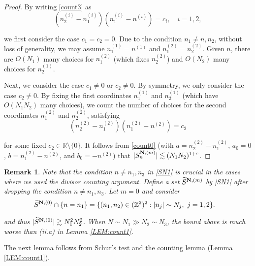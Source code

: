 \documentclass[%
11pt,  reqno]{amsart}
\newtheorem{remark}[theorem]{Remark}
\newcommand{\1}{\hspace{0.2mm}\text{I}\hspace{0.2mm}}
\newcommand{\noi}{\noindent}
\newcommand{\Z}{\mathbb{Z}}
\newcommand{\R}{\mathbb{R}}
\newcommand{\eps}{\varepsilon}
\newcommand{\wt}{\widetilde}
\newcommand{\les}{\lesssim}
\newcommand{\ges}{\gtrsim}
\numberwithin{equation}{section}
\numberwithin{theorem}{section}
\begin{document}
\begin{proof}
\noi
By writing \eqref{count3}
as 
\[
(n_2^{(i)}- n_1^{(i)}) (n_1^{(i)} - n^{(i)}) = c_i, \quad i = 1, 2, 
\]


\noi
we first consider the case $c_1 = c_2 = 0$.
Due to the condition $n_1 \neq n, n_2$, without loss of generality, we may assume 
$n_1^{(1)} = n^{(1)}$ and $n_1^{(2)} = n_2^{(2)}$. 
Given $n$, 
there are $O(N_1)$ many choices for $n_1^{(2)}$
(which fixes $n_2^{(2)}$)
and $O(N_2)$ many choices for $n_2^{(1)}$.



Next, we consider the case  $c_1 \neq 0$ or $c_2 \neq 0$.
By symmetry, we only consider the case $c_2 \neq 0$.
By fixing the first coordinates $n_1^{(1)}$ and $n_2^{(1)}$ 
(which have $O(N_1N_2)$ many choices),
we count the number of choices for the second coordinates
$n_1^{(2)}$ and $n_2^{(2)}$,  satisfying
\[
(n_2^{(2)}- n_1^{(2)}) (n_1^{(2)} - n^{(2)})
= c_2\]

\noi
for some fixed $c_2 \in \R \setminus\{0\}$.
It follows from \eqref{count0}
(with $a = n_2^{(2)}- n_1^{(2)}$, $a_0 = 0$, 
$b = n_1^{(2)} - n^{(2)}$, and $b_0 = -  n^{(2)}$) 
that
 $|S^{{\bf N}, (m)}_{n}| \les  (N_1N_2)^{1+\eps}$.
\end{proof}






\begin{remark}\label{REM:count}
\rm
Note that the condition $n \neq n_1, n_3$ in \eqref{SN1} is crucial
in the cases where we used the divisor counting argument.
Define
a set $\wt S^{{\bf N}, (m)}$
by \eqref{SN1} after dropping the condition 
 $n\ne n_1, n_3$.
 Let $m =0$ and consider
\begin{align*}
\wt S^{{\bf N}, (0)}
\cap \{n = n_1\}
& = \{ (n_1,n_2) \in (\Z^2)^2: |n_j| \sim N_j, \ j = 1, 2\}.
\end{align*}

\noi
and thus $|\wt S^{{\bf N}, (0)}| \ges N_1^2 N_2^2$.
When $N \sim N_1 \gg N_2 \sim N_3$, 
the  bound above is much worse than (ii.a) in Lemma \ref{LEM:count1}.
\end{remark}









The next lemma follows from Schur's test and the counting lemma (Lemma \ref{LEM:count1}).
\end{document}
